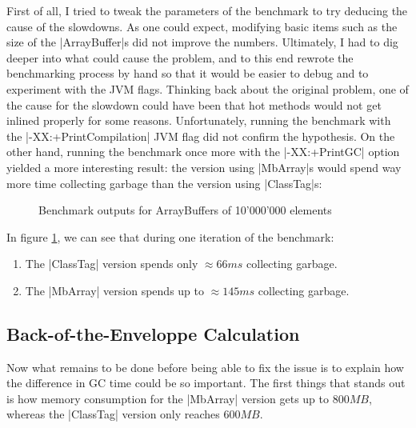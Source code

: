 First of all, I tried to tweak the parameters of the benchmark to try deducing the cause of the slowdowns. As one could expect, modifying basic items such as the size of the |ArrayBuffer|s did not improve the numbers. Ultimately, I had to dig deeper into what could cause the problem, and to this end rewrote the benchmarking process by hand so that it would be easier to debug and to experiment with the JVM flags. Thinking back about the original problem, one of the cause for the slowdown could have been that hot methods would not get inlined properly for some reasons. Unfortunately, running the benchmark with the |-XX:+PrintCompilation| JVM flag did not confirm the hypothesis. On the other hand, running the benchmark once more with the |-XX:+PrintGC| option yielded a more interesting result: the version using |MbArray|s would spend way more time collecting garbage than the version using |ClassTag|s:

\begin{figure}
\centering
{}
\caption{Benchmark outputs for ArrayBuffers of 10'000'000 elements}\label{fig:BenchOuts}
\label{fig:GcComp}
\end{figure}

In figure \ref{fig:GcComp}, we can see that during one iteration of the benchmark:
\begin{enumerate}
  \item The |ClassTag| version spends only $\approx 66ms$ collecting garbage.
  \item The |MbArray| version spends up to $\approx 145ms$ collecting garbage. 
\end{enumerate} 

\subsection{Back-of-the-Enveloppe Calculation}

Now what remains to be done before being able to fix the issue is to explain how the difference in GC time could be so important.
The first things that stands out is how memory consumption for the |MbArray| version gets up to $800MB$, whereas the |ClassTag| version only reaches $600MB$.


